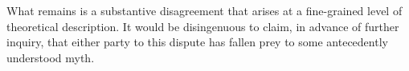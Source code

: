 \documentclass[12pt]{article}
\begin{document}
What remains is a substantive disagreement that arises at a fine-grained level of theoretical description. It would be disingenuous to claim, in advance of further inquiry, that either party to this dispute has fallen prey to some antecedently understood myth.


 
 
\end{document}
